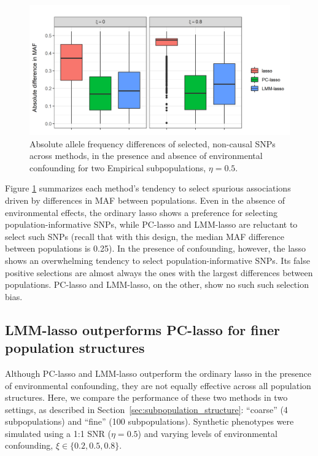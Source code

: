 \begin{figure}[hbt]
\centering
\includegraphics[scale = 0.9]{figures/pop_inf_snps_box.png}
\caption{Absolute allele frequency differences of selected, non-causal SNPs across methods, in the presence and absence of environmental confounding for two Empirical subpopulations, $\eta = 0.5$.}
\label{fig:pop_inf}
\end{figure}

Figure \ref{fig:pop_inf} summarizes each method's tendency to select spurious associations driven by differences in MAF between populations.  Even in the absence of environmental effects, the ordinary lasso shows a preference for selecting population-informative SNPs, while PC-lasso and LMM-lasso are reluctant to select such SNPs (recall that with this design, the median MAF difference between populations is 0.25).  In the presence of confounding, however, the lasso shows an overwhelming tendency to select population-informative SNPs.  Its false positive selections are almost always the ones with the largest differences between populations.  PC-lasso and LMM-lasso, on the other, show no such such selection bias.


\subsection{LMM-lasso outperforms PC-lasso for finer population structures}
\label{sec:sim-fine-coarse}

Although PC-lasso and LMM-lasso outperform the ordinary lasso in the presence of environmental confounding, they are not equally effective across all population structures.  Here, we compare the performance of these two methods in two settings, as described in Section~\ref{sec:subpopulation_structure}: ``coarse'' (4 subpopulations) and ``fine'' (100 subpopulations).  Synthetic phenotypes were simulated using a 1:1 SNR ($\eta = 0.5$) and varying levels of environmental confounding, $\xi \in \{0.2, 0.5,0.8\}$. 

